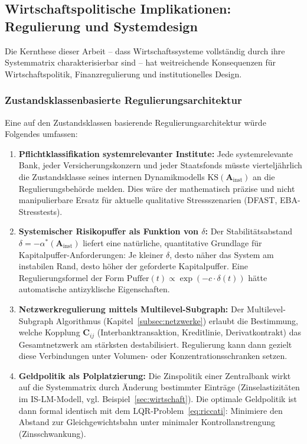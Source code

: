 \documentclass[a4paper, 12pt, twoside, openright]{report}
\theoremstyle{definition}
\theoremstyle{definition}
\newcommand{\vA}{\bm{A}}
\newcommand{\vC}{\bm{C}}
\newcommand{\KS}{\mathrm{KS}}
\begin{document}
\subsection{Wirtschaftspolitische Implikationen: Regulierung und Systemdesign}
\label{subsec:wirtschaftspolitik}

Die Kernthese dieser Arbeit -- dass Wirtschaftssysteme vollständig durch
ihre Systemmatrix charakterisierbar sind -- hat weitreichende Konsequenzen für
Wirtschaftspolitik, Finanzregulierung und institutionelles Design.

\subsubsection*{Zustandsklassenbasierte Regulierungsarchitektur}

Eine auf den Zustandsklassen basierende Regulierungsarchitektur würde Folgendes umfassen:

\begin{enumerate}[label=\textbf{R\arabic*.}]
  \item \textbf{Pflichtklassifikation systemrelevanter Institute:}
    Jede systemrelevante Bank, jeder Versicherungskonzern und jeder Staatsfonds
    müsste vierteljährlich die Zustandsklasse seines internen Dynamikmodells
    $\KS(\vA_{\mathrm{inst}})$ an die Regulierungsbehörde melden. Dies wäre der
    mathematisch präzise und nicht manipulierbare Ersatz für aktuelle
    qualitative Stressszenarien (DFAST, EBA-Stresstests).

  \item \textbf{Systemischer Risikopuffer als Funktion von $\delta$:}
    Der Stabilitätsabstand $\delta = -\alpha^*(\vA_{\mathrm{inst}})$ liefert
    eine natürliche, quantitative Grundlage für Kapitalpuffer-Anfor\-derungen:
    Je kleiner $\delta$, desto näher das System am instabilen Rand, desto
    höher der geforderte Kapitalpuffer. Eine Regulierungs\-formel der Form
    $\mathrm{Puffer}(t) \propto \exp(-c \cdot \delta(t))$ hätte automatische
    antizyklische Eigenschaften.

  \item \textbf{Netzwerkregulierung mittels Multilevel-Subgraph:}
    Der Multilevel-Subgraph Algorithmus (Kapitel~\ref{subsec:netzwerke}) erlaubt
    die Bestimmung, welche Kopplung $\vC_{ij}$ (Interbanktransaktion, Kreditlinie,
    Derivatkontrakt) das Gesamtnetzwerk am stärksten destabilisiert. Regulierung
    kann dann gezielt diese Verbindungen unter Volumen- oder Konzentrationsschranken
    setzen.

  \item \textbf{Geldpolitik als Polplatzierung:}
    Die Zinspolitik einer Zentralbank wirkt auf die Systemmatrix durch
    Änderung bestimmter Einträge (Zinselastizitäten im IS-LM-Modell, vgl.
    Beispiel~\ref{sec:wirtschaft}). Die optimale Geldpolitik ist dann formal
    identisch mit dem LQR-Problem~\eqref{eq:riccati}: Minimiere den Abstand
    zur Gleichgewichtsbahn unter minimaler Kontrollanstrengung (Zinsschwankung).
\end{enumerate}
\end{document}
